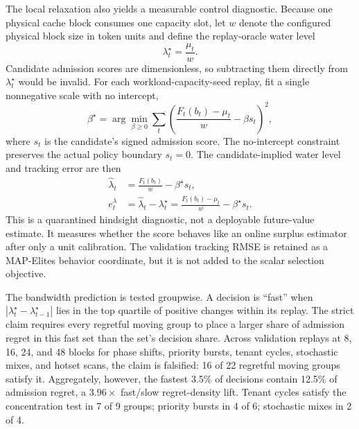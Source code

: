\documentclass[11pt]{article}
\begin{document}
The local relaxation also yields a measurable control diagnostic.  Because one
physical cache block consumes one capacity slot, let \(w\) denote the configured
physical block size in token units and define the replay-oracle water level
\begin{equation}
  \lambda_t^\star=\frac{\mu_t}{w}.
  \label{eq:oracle-shadow-price}
\end{equation}
Candidate admission scores are dimensionless, so subtracting them directly from
\(\lambda_t^\star\) would be invalid.  For each workload-capacity-seed replay, fit a
single nonnegative scale with no intercept,
\begin{equation}
  \beta^\star=
  \arg\min_{\beta\ge0}
  \sum_t\left(
    \frac{F_t(b_t)-\mu_t}{w}-\beta s_t
  \right)^2,
  \label{eq:shadow-score-calibration}
\end{equation}
where \(s_t\) is the candidate's signed admission score.  The no-intercept constraint
preserves the actual policy boundary \(s_t=0\).  The candidate-implied water level and
tracking error are then
\begin{align}
  \widehat\lambda_t
  &=\frac{F_t(b_t)}{w}-\beta^\star s_t,\\
  e_t^\lambda
  &=\widehat\lambda_t-\lambda_t^\star
   =\frac{F_t(b_t)-\mu_t}{w}-\beta^\star s_t.
  \label{eq:shadow-tracking-error}
\end{align}
This is a quarantined hindsight diagnostic, not a deployable future-value estimate.
It measures whether the score behaves like an online surplus estimator after only a
unit calibration.  The validation tracking RMSE is retained as a MAP-Elites behavior
coordinate, but it is not added to the scalar selection objective.

The bandwidth prediction is tested groupwise.  A decision is ``fast'' when
\(|\lambda_t^\star-\lambda_{t-1}^\star|\) lies in the top quartile of positive changes
within its replay.  The strict claim requires every regretful moving group to place a
larger share of admission regret in this fast set than the set's decision share.
Across validation replays at 8, 16, 24, and 48 blocks for phase shifts, priority
bursts, tenant cycles, stochastic mixes, and hotset scans, the claim is falsified:
16 of 22 regretful moving groups satisfy it.  Aggregately, however, the fastest
3.5\% of decisions contain 12.5\% of admission regret, a \(3.96\times\) fast/slow
regret-density lift.  Tenant cycles satisfy the concentration test in 7 of 9 groups;
priority bursts in 4 of 6; stochastic mixes in 2 of 4.
\end{document}
